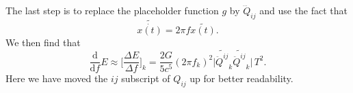 The last step is to replace the placeholder function $g$ by $\dddot{Q}_{ij}$ and use the fact that
\begin{equation}
\widetilde{\dot{x(t)}} = 2\pi f \widetilde{x(t)}.  
\end{equation}
We then find that 
\begin{equation}
\frac{\mathrm{d}}{\mathrm{d} f} E \approx \Bigg[\frac{\Delta E}{\Delta f}\Bigg]_k =\frac{2G}{5 c^5} (2\pi f_k)^2 \big|\widetilde{\ddot{Q}^{ij}}_k \widetilde{\ddot{Q}^{ij}}_k| \, T^2.  
\end{equation}
Here we have moved the $ij$ subscript of $Q_{ij}$ up for better readability. 












